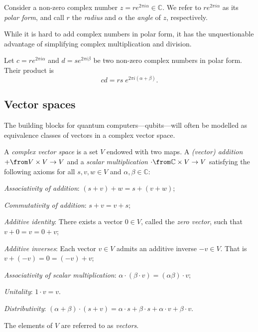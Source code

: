 \documentclass[a4paper,oneside, 12pt]{amsart}
\begin{document}
\begin{definition}\label{def:polar-decomposition}
  Consider a non-zero complex number \(z=re^{2\pi i \alpha} \in \mathbb{C}\).
  We refer to \(r e^{2\pi i \alpha}\) as its \emph{polar form}, and call \(r\) the \emph{radius} and \(\alpha\) the \emph{angle} of \(z\), respectively.
\end{definition}

While it is hard to add complex numbers in polar form, it has the unquestionable advantage of simplifying complex  multiplication and division.

\begin{lemma}\label{lem:multiplication-in-polar-form}
  Let \( c = r e^{2\pi i \alpha} \) and \( d = s e^{2\pi i \beta} \) be two non-zero complex numbers in polar form.
  Their product is
  \begin{equation}
    cd = rs \; e^{2\pi i (\alpha + \beta)}.
  \end{equation}
\end{lemma}

\subsection{Vector spaces}\label{sec:vector-spaces}
The building blocks for quantum computers---qubits---will often be modelled as equivalence classes of vectors in a complex vector space.

\begin{definition}\label{def:complex-vector-space}
  A \emph{complex vector space} is a set \( V \) endowed with two maps.
  A \emph{(vector) addition} \( +\from V \times V \to V \) and a \emph{scalar multiplication} \( \cdot\from \mathbb{C} \times V \to V \) satisfying the following axioms for all \( s, v, w \in V \) and \( \alpha, \beta \in \mathbb{C} \):

  \begin{thmlist}
    \item \emph{Associativity of addition}: \( (s + v) + w = s + (v + w) \);
    \item \emph{Commutativity of  addition}: \( s + v = v + s \);
    \item \emph{Additive identity}: There exists a vector \( 0 \in V \), called the \emph{zero vector},  such that \( v + 0 = v = 0 + v \);
    \item \emph{Additive inverses}: Each vector \( v \in V \) admits an additive inverse \(-v \in V\). That is \( v + (-v) = 0 = (-v) + v \);
    \item \emph{Associativity of scalar multiplication}: \( \alpha \cdot (\beta \cdot v) = (\alpha \beta) \cdot v \);
    \item \emph{Unitality}: \( 1 \cdot v = v \).
    \item \emph{Distributivity}: \( (\alpha + \beta) \cdot (s + v) = \alpha \cdot s + \beta \cdot s + \alpha \cdot v + \beta \cdot v\).
  \end{thmlist}
  The elements of \(V\) are referred to as \emph{vectors}.
\end{definition}
\end{document}
